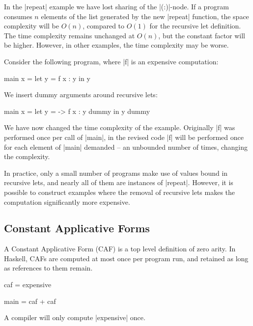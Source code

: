 In the |repeat| example we have lost sharing of the |(:)|-node. If a program consumes $n$ elements of the list generated by the new |repeat| function, the space complexity will be $O(n)$, compared to $O(1)$ for the recursive let definition. The time complexity remains unchanged at $O(n)$, but the constant factor will be higher. However, in other examples, the time complexity may be worse.

\begin{example}
Consider the following program, where |f| is an expensive computation:

\begin{code}
main x =  let y = f x : y
          in y
\end{code}

We insert dummy arguments around recursive lets:

\begin{code}
main x =  let y = \dummy -> f x : y dummy
          in y dummy
\end{code}

We have now changed the time complexity of the example. Originally |f| was performed once per call of |main|, in the revised code |f| will be performed once for each element of |main| demanded -- an unbounded number of times, changing the complexity.
\end{example}

In practice, only a small number of programs make use of values bound in recursive lets, and nearly all of them are instances of |repeat|. However, it is possible to construct examples where the removal of recursive lets makes the computation significantly more expensive.

\subsection{Constant Applicative Forms}

A Constant Applicative Form (CAF) is a top level definition of zero arity. In Haskell, CAFs are computed at most once per program run, and retained as long as references to them remain.

\begin{example}
\begin{code}
caf = expensive

main = caf + caf
\end{code}

A compiler will only compute |expensive| once.
\end{example}

